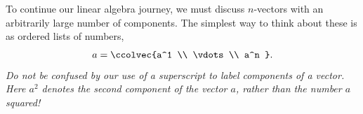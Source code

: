 \chapter{\vectorsInSpaceTitle}
\label{vectorsinspace}

%

%
%

To continue our linear algebra journey, we must discuss $n$-vectors with an arbitrarily large number of components. 
The simplest way to think about these is as  ordered  lists of numbers, 
\[a=\ccolvec{a^1 \\ \vdots \\ a^n } .\]
%
\noindent
{\it 
Do not be confused by our use of a superscript to label components of a vector. Here $a^2$ denotes
the second component of the vector $a$, rather than the number $a$ squared!}  

